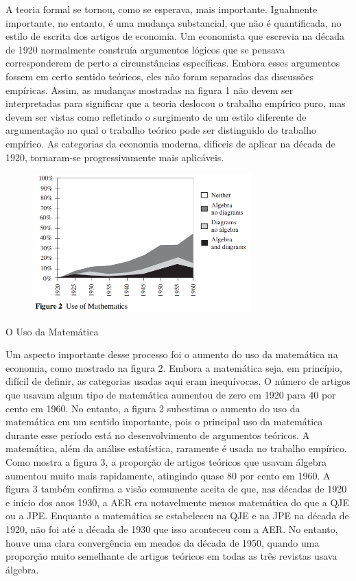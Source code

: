 \documentclass[12pt]{article}
\begin{document}
A teoria formal se tornou, como se esperava, mais importante. Igualmente importante, no entanto, é uma mudança substancial, que não é quantificada, no estilo de escrita dos artigos de economia. Um economista que escrevia na década de 1920 normalmente construía argumentos lógicos que se pensava corresponderem de perto a circunstâncias específicas. Embora esses argumentos fossem em certo sentido teóricos, eles não foram separados das discussões empíricas. Assim, as mudanças mostradas na figura 1 não devem ser interpretadas para significar que a teoria deslocou o trabalho empírico puro, mas devem ser vistas como refletindo o surgimento de um estilo diferente de argumentação no qual o trabalho teórico pode ser distinguido do trabalho empírico. As categorias da economia moderna, difíceis de aplicar na década de 1920, tornaram-se progressivamente mais aplicáveis.

 \begin{figure}[H]
    \centering
    \includegraphics[width=0.75\textwidth]{4º Período/História do Pensamento Econômico/Tradução HPE/Tradução Tópico 7.2/figure 2.png}
    \end{figure}

O Uso da Matemática

Um aspecto importante desse processo foi o aumento do uso da matemática na economia, como mostrado na figura 2. Embora a matemática seja, em princípio, difícil de definir, as categorias usadas aqui eram inequívocas. O número de artigos que usavam algum tipo de matemática aumentou de zero em 1920 para 40 por cento em 1960. No entanto, a figura 2 subestima o aumento do uso da matemática em um sentido importante, pois o principal uso da matemática durante esse período está no desenvolvimento de argumentos teóricos. A matemática, além da análise estatística, raramente é usada no trabalho empírico. Como mostra a figura 3, a proporção de artigos teóricos que usavam álgebra aumentou muito mais rapidamente, atingindo quase 80 por cento em 1960. A figura 3 também confirma a visão comumente aceita de que, nas décadas de 1920 e início dos anos 1930, a AER era notavelmente menos matemática do que a QJE ou a JPE. Enquanto a matemática se estabeleceu na QJE e na JPE na década de 1920, não foi até a década de 1930 que isso aconteceu com a AER. No entanto, houve uma clara convergência em meados da década de 1950, quando uma proporção muito semelhante de artigos teóricos em todas as três revistas usava álgebra.
\end{document}
